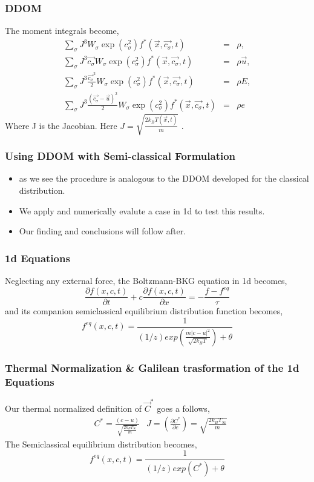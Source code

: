 \begin{frame}
	\frametitle{DDOM}
	The moment integrals become,
	\begin{eqnarray}
		\sum_\sigma J^3 W_\sigma \exp(c_\sigma^2) f^*(\vec{x},\vec{c_\sigma},t) &=&  \rho, \\
		\sum_\sigma J^3 \vec{c_\sigma} W_\sigma \exp(c_\sigma^2) f^*(\vec{x},\vec{c_\sigma},t)&=& \rho \vec{u}, \nonumber \\
		\sum_\sigma J^3 \frac{\vec{c_\sigma}^2}{2} W_\sigma \exp(c_\sigma^2) f^*(\vec{x},\vec{c_\sigma},t)&=& \rho E, \nonumber \\
		\sum_\sigma J^3 \frac{(\vec{c_\sigma}-\vec{u})^2}{2} W_\sigma \exp(c_\sigma^2) f^*(\vec{x},\vec{c_\sigma},t) &=& \rho e  \nonumber
	\end{eqnarray}
	Where J is the Jacobian. Here $J = \sqrt{\frac{2k_B T(\vec{x},t)}{m}}$ .
\end{frame}


\begin{frame}
	\frametitle{Using DDOM with Semi-classical Formulation}
	\begin{itemize}
	\item as we see the procedure is analogous to the DDOM developed for the classical distribution.
	\item We apply and numerically evalute a case in 1d to test this results.
	\item Our finding and conclusions will follow after.
	\end{itemize}	
\end{frame}

\begin{frame}
	\frametitle{1d Equations}
	Neglecting any external force, the Boltzmann-BKG equation in 1d becomes,
	\begin{equation}
	\frac{\partial f(x,c,t)}{\partial t} + c \frac{\partial f(x,c,t)}{\partial x} = -\frac{f - f^{eq}}{\tau}
	\end{equation}
	and its companion semiclassical equilibrium distribution function becomes,
	\begin{equation}
	f^{eq} (x,c,t) = \frac{1}{(1/z) exp( \frac{ m \left | c - u \right |^2}{\sqrt{2 k_B T}} )+\theta}
	\end{equation}
\end{frame}

\begin{frame}
	\frametitle{Thermal Normalization \& Galilean trasformation of the 1d Equations}
	Our thermal normalized definition of $\vec{C}^*$ goes a follows,
	\begin{align*}
	& C^* = \frac{(c-u)}{\sqrt{\frac{2k_BT_\infty}{m}}} & J = \left(\frac{\partial C^*}{\partial c} \right ) = \sqrt{\frac{2k_BT_\infty}{m}} 
	\end{align*}
	The Semiclassical equilibrium distribution becomes,
	\begin{equation}
	f^{eq} ( x, c, t) = \frac{1}{(1/  z) exp({C^*})+ \theta}
	\label{eq:normadistf1d}
	\end{equation}
\end{frame}

